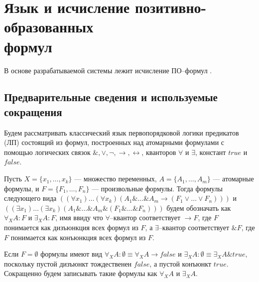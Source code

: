 
\section[Язык и исчисление позитивно-образованных формул]{Язык и исчисление позитивно-образованных\\ формул}

В основе разрабатываемой системы лежит исчисление ПО--формул \cite{ICDS2000, DavydovX, SNV1990, mais}.


\subsection{Предварительные сведения и используемые сокращения}
Будем рассматривать классический язык первопорядковой логики предикатов (ЛП) состоящий из формул, построенных над атомарными формулами с помощью логических связок $\&, \vee, \neg, \rightarrow, \leftrightarrow$, кванторов $\forall$ и $\exists$, констант $true$ и $false$. 

Пусть $X = \{x_1,\ldots,x_k\}$ --- множество переменных, $A = \{A_1,\ldots,A_m\}$ --- атомарные формулы, и $F = \{F_1,\ldots,F_n\}$ --- произвольные формулы. Тогда формулы следующего вида $((\forall x_1) \ldots (\forall x_k) (A_1 \& \ldots \& A_m \rightarrow (F_1 \vee \ldots \vee F_n)))$ и $((\exists x_1) \ldots (\exists x_k) (A_1 \& \ldots \& A_m \& (F_1 \& \ldots \& F_n)))$ будем обозначать как $\forall_XA\colon F$ и $\exists_XA\colon F$, имя ввиду что $\forall$--квантор соответствует $\rightarrow F$, где $F$ понимается как дизъюнкция всех формул из $F$, а $\exists$--квантор соответствует $\& F$, где $F$ понимается как конъюнкция всех формул из $F$.

Если $F = \emptyset$ формулы имеют вид $\forall_XA\colon\emptyset \equiv \forall_XA \rightarrow false$ и $\exists_XA\colon\emptyset \equiv \exists_XA \& true$, поскольку пустой дизъюнкт тождественен $false$, а пустой конъюнкт $true$. Сокращенно будем записывать такие формулы как $\forall_XA$ и $\exists_XA$.

